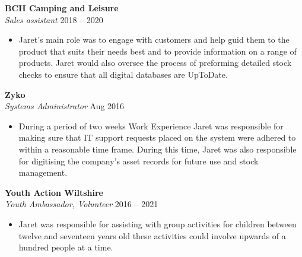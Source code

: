 \noindent
\textbf{BCH Camping and Leisure}\\
\textit{Sales assistant} \hfill 2018 – 2020
\begin{itemize}
    \item Jaret’s main role was to engage with customers and help guid them to the product that suits their needs best and to provide information on a range of products. Jaret would also oversee the process of preforming detailed stock checks to ensure that all digital databases are UpToDate. 
\end{itemize}

\noindent
\textbf{Zyko}\\
\textit{Systems Administrator} \hfill Aug 2016
\begin{itemize}
    \item During a period of two weeks Work Experience Jaret was responsible for making sure that IT support requests placed on the system were adhered to within a reasonable time frame. During this time, Jaret was also responsible for digitising the company’s asset records for future use and stock management.
\end{itemize}


\noindent
\textbf{Youth Action Wiltshire}\\
\textit{Youth Ambassador, Volunteer} \hfill 2016 – 2021
\begin{itemize}
    \item Jaret was responsible for assisting with group activities for children between twelve and seventeen years old these activities could involve upwards of a hundred people at a time.
\end{itemize}

